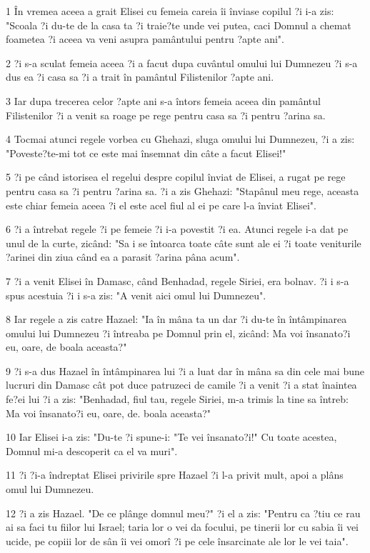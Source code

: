 \par 1 În vremea aceea a grait Elisei cu femeia careia îi înviase copilul ?i i-a zis: "Scoala ?i du-te de la casa ta ?i traie?te unde vei putea, caci Domnul a chemat foametea ?i aceea va veni asupra pamântului pentru ?apte ani".
\par 2 ?i s-a sculat femeia aceea ?i a facut dupa cuvântul omului lui Dumnezeu ?i s-a dus ea ?i casa sa ?i a trait în pamântul Filistenilor ?apte ani.
\par 3 Iar dupa trecerea celor ?apte ani s-a întors femeia aceea din pamântul Filistenilor ?i a venit sa roage pe rege pentru casa sa ?i pentru ?arina sa.
\par 4 Tocmai atunci regele vorbea cu Ghehazi, sluga omului lui Dumnezeu, ?i a zis: "Poveste?te-mi tot ce este mai însemnat din câte a facut Elisei!"
\par 5 ?i pe când istorisea el regelui despre copilul înviat de Elisei, a rugat pe rege pentru casa sa ?i pentru ?arina sa. ?i a zis Ghehazi: "Stapânul meu rege, aceasta este chiar femeia aceea ?i el este acel fiul al ei pe care l-a înviat Elisei".
\par 6 ?i a întrebat regele ?i pe femeie ?i i-a povestit ?i ea. Atunci regele i-a dat pe unul de la curte, zicând: "Sa i se întoarca toate câte sunt ale ei ?i toate veniturile ?arinei din ziua când ea a parasit ?arina pâna acum".
\par 7 ?i a venit Elisei în Damasc, când Benhadad, regele Siriei, era bolnav. ?i i s-a spus acestuia ?i i s-a zis: "A venit aici omul lui Dumnezeu".
\par 8 Iar regele a zis catre Hazael: "Ia în mâna ta un dar ?i du-te în întâmpinarea omului lui Dumnezeu ?i întreaba pe Domnul prin el, zicând: Ma voi însanato?i eu, oare, de boala aceasta?"
\par 9 ?i s-a dus Hazael în întâmpinarea lui ?i a luat dar în mâna sa din cele mai bune lucruri din Damasc cât pot duce patruzeci de camile ?i a venit ?i a stat înaintea fe?ei lui ?i a zis: "Benhadad, fiul tau, regele Siriei, m-a trimis la tine sa întreb: Ma voi însanato?i eu, oare, de. boala aceasta?"
\par 10 Iar Elisei i-a zis: "Du-te ?i spune-i: "Te vei însanato?i!" Cu toate acestea, Domnul mi-a descoperit ca el va muri".
\par 11 ?i ?i-a îndreptat Elisei privirile spre Hazael ?i l-a privit mult, apoi a plâns omul lui Dumnezeu.
\par 12 ?i a zis Hazael. "De ce plânge domnul meu?" ?i el a zis: "Pentru ca ?tiu ce rau ai sa faci tu fiilor lui Israel; taria lor o vei da focului, pe tinerii lor cu sabia îi vei ucide, pe copiii lor de sân îi vei omorî ?i pe cele însarcinate ale lor le vei taia".
